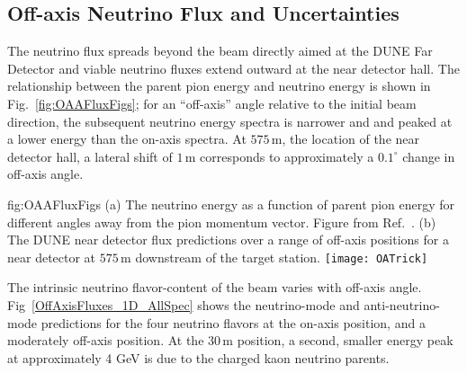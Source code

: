 \subsection{Off-axis Neutrino Flux and Uncertainties}

The neutrino flux spreads beyond the beam directly aimed at the DUNE Far Detector and viable neutrino fluxes extend outward at the near detector hall. The relationship between the parent pion energy and neutrino energy is shown in Fig.~\ref{fig:OAAFluxFigs}; for an ``off-axis'' angle relative to the initial beam direction, the subsequent neutrino energy spectra is narrower and and peaked at a lower energy than the on-axis spectra. At $575\,\textrm{m}$, the location of the near detector hall, a lateral shift of $1\,\textrm{m}$ corresponds to approximately a $0.1^\circ$ change in off-axis angle.

\begin{dunefigure}{fig:OAAFluxFigs}
{(a) The neutrino energy as a function of parent pion energy for different angles away from the pion momentum vector. Figure from Ref.~\cite{Duffy:2016owt}. (b) The DUNE near detector flux predictions over a range of off-axis positions for a near detector at $575\,\textrm{m}$ downstream of the target station. }
    \texttt{[image: OATrick]}
\end{dunefigure}

The intrinsic neutrino flavor-content of the beam varies with off-axis angle. Fig~\ref{OffAxisFluxes_1D_AllSpec} shows the neutrino-mode and anti-neutrino-mode predictions for the four neutrino flavors at the on-axis position, and a moderately off-axis position. At the $30\,\textrm{m}$ position, a second, smaller energy peak at approximately 4 GeV is due to the charged kaon neutrino parents. 


